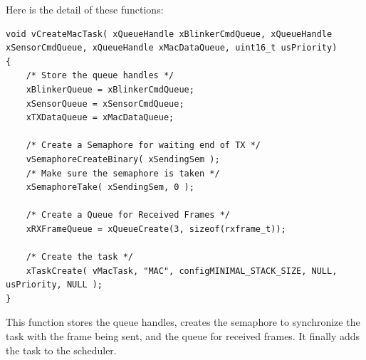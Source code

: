 \documentclass[11pt]{report}
\begin{document}
Here is the detail of these functions:

\begin{verbatim}
void vCreateMacTask( xQueueHandle xBlinkerCmdQueue, xQueueHandle xSensorCmdQueue, xQueueHandle xMacDataQueue, uint16_t usPriority)
{
    /* Store the queue handles */
    xBlinkerQueue = xBlinkerCmdQueue;
    xSensorQueue = xSensorCmdQueue;
    xTXDataQueue = xMacDataQueue;

    /* Create a Semaphore for waiting end of TX */
    vSemaphoreCreateBinary( xSendingSem );
    /* Make sure the semaphore is taken */
    xSemaphoreTake( xSendingSem, 0 );

    /* Create a Queue for Received Frames */
    xRXFrameQueue = xQueueCreate(3, sizeof(rxframe_t));

    /* Create the task */
    xTaskCreate( vMacTask, "MAC", configMINIMAL_STACK_SIZE, NULL, usPriority, NULL );
}
\end{verbatim}
This function stores the queue handles, creates the semaphore to synchronize the task with the frame being sent, and the queue for received frames. It finally adds the task to the scheduler.
\end{document}
